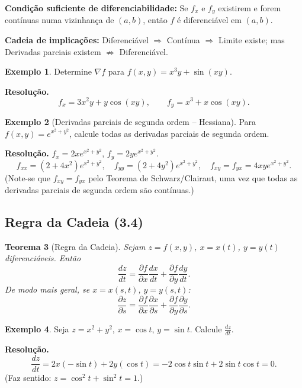 \documentclass[12pt,a4paper]{article}
\newtheorem{theorem}{Teorema}[section]
\theoremstyle{definition}
\newtheorem{example}[theorem]{Exemplo}
\theoremstyle{remark}
\begin{document}
\begin{keybox}
\textbf{Condição suficiente de diferenciabilidade:} Se $f_x$ e $f_y$
existirem e forem contínuas numa vizinhança de $(a,b)$, então $f$ é
diferenciável em $(a,b)$.

\medskip
\textbf{Cadeia de implicações:}
Diferenciável $\Rightarrow$ Contínua $\Rightarrow$ Limite existe;
mas Derivadas parciais existem $\not\Rightarrow$ Diferenciável.
\end{keybox}

\begin{example}
  Determine $\nabla f$ para $f(x,y)=x^3 y + \sin(xy)$.

  \textbf{Resolução.}
  \[
    f_x = 3x^2 y + y\cos(xy), \qquad f_y = x^3 + x\cos(xy).
  \]
\end{example}

\begin{example}[Derivadas parciais de segunda ordem -- Hessiana]
  Para $f(x,y)=e^{x^2+y^2}$, calcule todas as derivadas parciais de
  segunda ordem.

  \textbf{Resolução.} $f_x = 2xe^{x^2+y^2}$, $f_y = 2ye^{x^2+y^2}$.
  \[
    f_{xx}=(2+4x^2)e^{x^2+y^2},\quad f_{yy}=(2+4y^2)e^{x^2+y^2},\quad
    f_{xy}=f_{yx}=4xye^{x^2+y^2}.
  \]
  (Note-se que $f_{xy}=f_{yx}$ pelo Teorema de Schwarz/Clairaut, uma vez
  que todas as derivadas parciais de segunda ordem são contínuas.)
\end{example}

\subsection{Regra da Cadeia (3.4)}

\begin{theorem}[Regra da Cadeia]
  Sejam $z=f(x,y)$, $x=x(t)$, $y=y(t)$ diferenciáveis. Então
  \[
    \frac{dz}{dt} = \frac{\partial f}{\partial x}\frac{dx}{dt}
                  + \frac{\partial f}{\partial y}\frac{dy}{dt}.
  \]
  De modo mais geral, se $x=x(s,t)$, $y=y(s,t)$:
  \[
    \frac{\partial z}{\partial s}
      = \frac{\partial f}{\partial x}\frac{\partial x}{\partial s}
      + \frac{\partial f}{\partial y}\frac{\partial y}{\partial s}.
  \]
\end{theorem}

\begin{example}
  Seja $z = x^2+y^2$, $x=\cos t$, $y=\sin t$. Calcule $\frac{dz}{dt}$.

  \textbf{Resolução.}
  \[
    \frac{dz}{dt} = 2x(-\sin t)+2y(\cos t) = -2\cos t\sin t + 2\sin t\cos t = 0.
  \]
  (Faz sentido: $z = \cos^2 t + \sin^2 t = 1$.)
\end{example}
\end{document}
